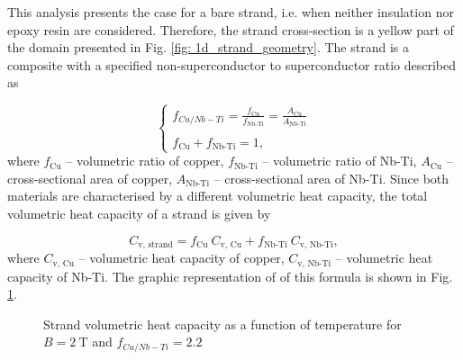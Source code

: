
This analysis presents the case for a bare strand, i.e. when neither insulation nor epoxy resin are considered. Therefore, the strand cross-section is a yellow part of the domain presented in Fig. \ref{fig: 1d_strand_geometry}. The strand is a composite with a specified non-superconductor to superconductor ratio described as 

\begin{equation}
    \left\{ \begin{array}{ll}
    f_{Cu/Nb-Ti} = \frac{f_\text{Cu}}{f_\text{Nb-Ti}} = \frac{A_\text{Cu}}{A_\text{Nb-Ti}}\\ \\
    f_\text{Cu} + f_\text{Nb-Ti} = 1,
    \end{array} \right.
    \label{eqn: non_super_to_super_ratio}
\end{equation}
where $f_\text{Cu}$ -- volumetric ratio of copper, $f_\text{Nb-Ti}$ -- volumetric ratio of Nb-Ti, $A_\text{Cu}$ -- cross-sectional area of copper, $A_\text{Nb-Ti}$ -- cross-sectional area of Nb-Ti. Since both materials are characterised by a different volumetric heat capacity, the total volumetric heat capacity of a strand is given by

\begin{equation}
    C_\text{v, strand} = f_\text{Cu} ~ C_\text{v, Cu} + f_\text{Nb-Ti} ~ C_\text{v, Nb-Ti},
    \label{eqn: cv_equiv}
\end{equation}
where $C_\text{v, Cu}$ -- volumetric heat capacity of copper, $C_\text{v, Nb-Ti}$ -- volumetric heat capacity of Nb-Ti. The graphic representation of of this formula is shown in Fig. \ref{fig:eq_wind_cp}.

\begin{figure}[h!]
\centering
    \caption{Strand volumetric heat capacity as a function of temperature for $B=2~\text{T}$ and $f_{Cu/Nb-Ti}=2.2$}
    \label{fig:eq_wind_cp}
\end{figure}


